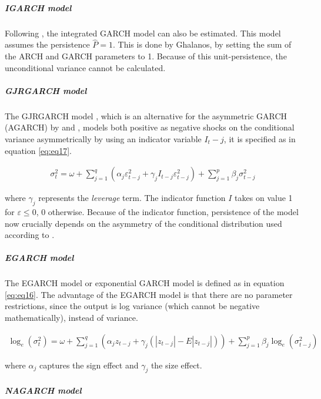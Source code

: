 \documentclass[a4paper, twoside]{templates/ociamthesis}
\begin{document}
\hypertarget{igarch-model}{%
\subparagraph{IGARCH model}\label{igarch-model}}

\noindent Following \textcite{ghalanos2020}, the integrated GARCH model \autocite{bollerslev1986} can also be estimated. This model assumes the persistence \(\hat{P} = 1\). This is done by Ghalanos, by setting the sum of the ARCH and GARCH parameters to 1. Because of this unit-persistence, the unconditional variance cannot be calculated.

\hypertarget{gjrgarch-model}{%
\subparagraph{GJRGARCH model}\label{gjrgarch-model}}

\noindent The GJRGARCH model \autocite{glosten1993}, which is an alternative for the asymmetric GARCH (AGARCH) by \textcite{engle1990} and \textcite{engle1993}, models both positive as negative shocks on the conditional variance asymmetrically by using an indicator variable \(I_t-j\), it is specified as in equation \eqref{eq:eq17}.

\begin{align}
\sigma_t^2 = \omega + \sum\limits_{j=1}^q (\alpha_j \varepsilon_{t-j}^2 + \gamma_j I_{t-j} \varepsilon_{t-j}^2) + \sum\limits_{j = 1}^p \beta_j \sigma_{t-j}^2
 \label{eq:eq17}
\end{align}

\noindent where \(\gamma_j\) represents the \emph{leverage} term. The indicator function \(I\) takes on value 1 for \(\varepsilon \le 0\), 0 otherwise. Because of the indicator function, persistence of the model now crucially depends on the asymmetry of the conditional distribution used according to \textcite{ghalanos2020}.

\hypertarget{egarch-model}{%
\subparagraph{EGARCH model}\label{egarch-model}}

\noindent The EGARCH model or exponential GARCH model \autocite{nelson1991} is defined as in equation \eqref{eq:eq16}. The advantage of the EGARCH model is that there are no parameter restrictions, since the output is log variance (which cannot be negative mathematically), instead of variance.

\begin{align}
\log_e(\sigma_t^2) = \omega + \sum\limits_{j=1}^q (\alpha_j z_{t-j} + \gamma_j (|z_{t-j}| - E|z_{t-j}|))+ \sum\limits_{j = 1}^p \beta_j \log_e(\sigma_{t-j}^2)
 \label{eq:eq16}
\end{align}

\noindent where \(\alpha_j\) captures the sign effect and \(\gamma_j\) the size effect.

\hypertarget{nagarch-model}{%
\subparagraph{NAGARCH model}\label{nagarch-model}}
\end{document}
